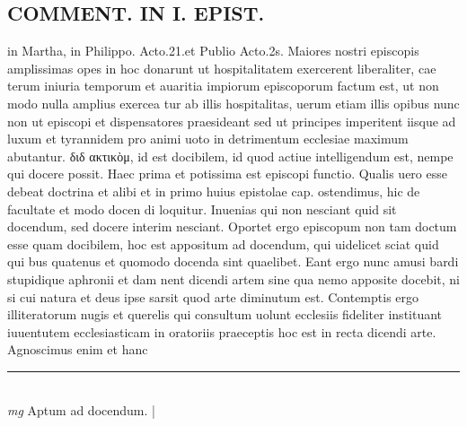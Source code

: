 \documentclass{article}
\begin{document}
\begin{pages}
\section*{COMMENT. IN I. EPIST. }\pstart in Martha, in Philippo. Acto.21.et Publio Acto.2s. Maiores nostri episcopis amplissimas opes in hoc donarunt ut hospitalitatem exercerent liberaliter, cae terum iniuria temporum et auaritia impiorum episcoporum factum est, ut non modo nulla amplius exercea tur ab illis hospitalitas, uerum etiam illis opibus nunc non ut episcopi et dispensatores praesideant sed ut principes imperitent iisque ad luxum et tyrannidem pro animi uoto in detrimentum ecclesiae maximum abutantur. διδ ακτικὸμ, id est docibilem, id quod actiue intelligendum est, nempe qui docere possit. Haec prima et potissima est episcopi functio. Qualis uero esse debeat doctrina et alibi et in primo huius epistolae cap. ostendimus, hic de facultate et modo docen di loquitur. Inuenias qui non nesciant quid sit docendum, sed docere interim nesciant. Oportet ergo episcopum non tam doctum esse quam docibilem, hoc est appositum ad docendum, qui uidelicet sciat quid qui bus quatenus et quomodo docenda sint quaelibet. Eant ergo nunc amusi bardi stupidique aphronii et dam nent dicendi artem sine qua nemo apposite docebit, ni si cui natura et deus ipse sarsit quod arte diminutum est. Contemptis ergo illiteratorum nugis et querelis qui consultum uolunt ecclesiis fideliter instituant iuuentutem ecclesiasticam in oratoriis praeceptis hoc est in recta dicendi arte. Agnoscimus enim et hanc  \pend
\vspace{0.5cm}\noindent
\vspace{0.2cm}\rule{1cm}{0.2pt}\\ 
\hspace{0.2cm}\textit{mg}
\footnotesize Aptum ad docendum. 
\normalsize| 

\end{pages}
\end{document}
